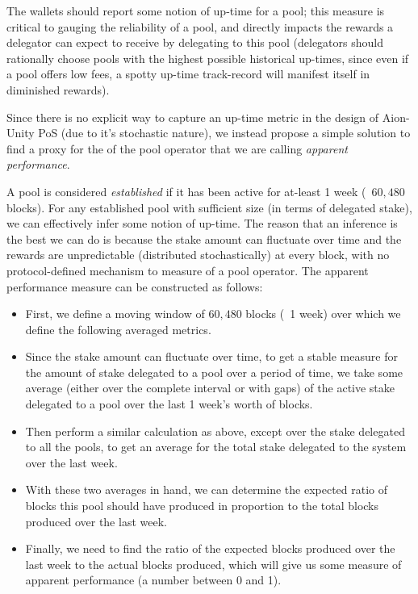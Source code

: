 The wallets should report some notion of up-time for a pool; this measure is critical to gauging the reliability of a pool, and directly impacts the rewards a delegator can expect to receive by delegating to this pool (delegators should rationally choose pools with the highest possible historical up-times, since even if a pool offers low fees, a spotty up-time track-record will manifest itself in diminished rewards). 

Since there is no explicit way to capture an up-time metric in the design of Aion-Unity PoS (due to it's stochastic nature), we instead propose a simple solution to find a proxy for the  of the pool operator that we are calling \textit{apparent performance}. 

A pool is considered \textit{established} if it has been active for at-least 1 week (~$60,480$ blocks). For any established pool with sufficient size (in terms of delegated stake), we can effectively infer some notion of up-time. The reason that an inference is the best we can do is because the stake amount can fluctuate over time and the rewards are unpredictable (distributed stochastically) at every block, with no protocol-defined mechanism to measure  of a pool operator. The apparent performance measure can be constructed as follows: 
\begin{itemize}[label=--,nosep]
    \item First, we define a moving window of $60,480$ blocks (~1 week) over which we define the following averaged metrics.
    \item Since the stake amount can fluctuate over time, to get a stable measure for the amount of stake delegated to a pool over a period of time, we take some average (either over the complete interval or with gaps) of the active stake delegated to a pool over the last 1 week's worth of blocks.
    \item Then perform a similar calculation as above, except over the stake delegated to all the pools, to get an average for the total stake delegated to the system over the last week.
    \item With these two averages in hand, we can determine the expected ratio of blocks this pool should have produced in proportion to the total blocks produced over the last week. 
    \item Finally, we need to find the ratio of the expected blocks produced over the last week to the actual blocks produced, which will give us some measure of apparent performance (a number between 0 and 1).  
\end{itemize}

